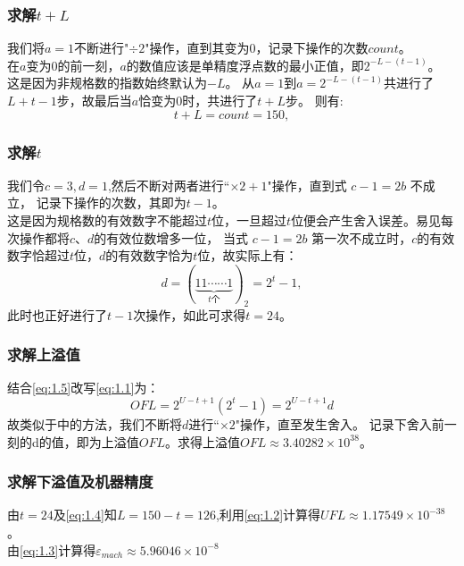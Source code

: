 \documentclass[a4paper,11pt,notitlepage]{article}
\begin{document}
\subsubsection{求解\texorpdfstring{$t + L$}{}}
\begin{adjustwidth}{1em}{0pt}
\qquad 我们将$a = 1$不断进行"$\div 2$"操作，直到其变为0，记录下操作的次数$count$。\\
\indent 在$a$变为0的前一刻，$a$的数值应该是单精度浮点数的最小正值，即$2^{-L-(t-1)}$。
这是因为非规格数的指数始终默认为$-L$。
从$a = 1$到$a = 2^{-L-(t-1)}$共进行了$L + t - 1$步，故最后当$a$恰变为$0$时，共进行了$t + L$步。
则有:
\begin{equation}
    t + L = count = 150, \label{eq:1.4}  
\end{equation}
\end{adjustwidth}
\subsubsection{求解\texorpdfstring{$t$}{}}
\begin{adjustwidth}{1em}{0pt}
\qquad 我们令$c = 3,d = 1$,然后不断对两者进行“$\times 2 + 1$"操作，直到式 $c - 1 = 2b$ 不成立，
记录下操作的次数，其即为$t - 1$。\\
\indent 这是因为规格数的有效数字不能超过$t$位，一旦超过$t$位便会产生舍入误差。易见每次操作都将$c$、$d$的有效位数增多一位，
当式 $c - 1 = 2b$ 第一次不成立时，$c$的有效数字恰超过$t$位，$d$的有效数字恰为$t$位，故实际上有：
\begin{equation}
    d = (\underbrace{11\cdots\cdots1}_{t\text{个}})_{2} = 2^{t} - 1, \label{eq:1.5}
\end{equation}
此时也正好进行了$t - 1$次操作，如此可求得$t = 24$。
\end{adjustwidth}
\subsubsection{求解上溢值}
\begin{adjustwidth}{1em}{0pt}
\qquad 结合\cref{eq:1.5}改写\cref{eq:1.1}为：
\[
    OFL = 2^{U-t+1} (2^{t} - 1) = 2^{U-t+1} d
\]
故类似于\MakeUppercase{}中的方法，我们不断将$d$进行“$\times 2$"操作，直至发生舍入。
记录下舍入前一刻的d的值，即为上溢值$OFL$。求得上溢值$OFL \approx 3.40282 \times 10^{38}$。
\end{adjustwidth}
\subsubsection{求解下溢值及机器精度}
\begin{adjustwidth}{1em}{0pt}
\qquad 由$t = 24$及\cref{eq:1.4}知$L = 150 - t = 126$,利用\cref{eq:1.2}计算得$UFL \approx 1.17549 \times 10^{-38}$。\\
\indent 由\cref{eq:1.3}计算得$\varepsilon_{mach} \approx 5.96046 \times 10^{-8}$
\end{adjustwidth}
\end{document}
